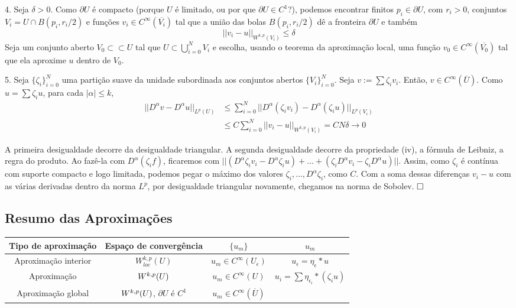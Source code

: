 \documentclass[a4paper, 11pt]{book}
\newcommand{\qed}{$\hfill\square$}
\newcommand{\pu}{\partial U}
\newcommand{\e}{\epsilon}
\begin{document}
4. Seja \( \delta >0 \). Como \( \pu \) é compacto (porque \( U \) é limitado, ou por que \( \pu \in C^1 \)?), podemos encontrar finitos \( p_i \in \pu \), com \( r_i>0 \), conjuntos \( V_i = U \cap B(p_i, r_i/2) \) e funções \( v_i \in C^\infty(\overline{V_i}) \) tal que a união das bolas \( B(p_i, r_i/2) \) dê a fronteira \( \pu \) e também \[ ||v_i - u||_{W^{k,p}(V_i)}\leq \delta \] Seja um conjunto aberto \( V_0 \subset\subset U \) tal que \( U \subset \bigcup_{i=0}^N V_i \) e escolha, usando o teorema da aproximação local, uma função \( v_0 \in C^\infty (\overline{V_0}) \) tal que ela aproxime \( u \) dentro de \( V_0 \).

5. Seja \( \{ \zeta_i \}_{i=0}^N \) uma partição suave da unidade subordinada aos conjuntos abertos \( \{V_i\}_{i=0}^N \). Seja \( v:= \sum \zeta_i v_i \). Então, \( v \in C^\infty (\overline{U}) \). Como \( u = \sum \zeta_i u \), para cada \( |\alpha|\leq k \), \begin{align*}
	||D^\alpha v - D^\alpha u||_{L^p(U)} &\leq \sum_{i=0}^{N} || D^\alpha (\zeta_i v_i) - D^\alpha (\zeta_i u)||_{L^p(V_i)}\\
	&\leq C \sum_{i=0}^N ||v_i - u||_{W^{k,p}(V_i)} = CN\delta \rightarrow 0
\end{align*}

A primeira desigualdade decorre da desigualdade triangular. A segunda desigualdade decorre da propriedade (iv), a fórmula de Leibniz, a regra do produto. Ao fazê-la com $D^\alpha(\zeta_i f)$, ficaremos com $||(D^\alpha\zeta_i v_i - D^\alpha\zeta_i u) + \ldots + (\zeta_i D^\alpha v_i - \zeta_i D^\alpha u) ||$. Assim, como $\zeta_i$ é contínua com suporte compacto e logo limitada, podemos pegar o máximo dos valores $\zeta_i, \ldots, D^\alpha\zeta_i$, como $C$. Com a soma dessas diferenças $v_i - u$ com as várias derivadas dentro da norma $L^p$, por desigualdade triangular novamente, chegamos na norma de Sobolev. \qed

\subsection*{Resumo das Aproximações}

\begin{tabular}{cccc}
	\hline
	Tipo de aproximação & Espaço de convergência & \( \{u_m\} \)  & \( u_m \) \\
	\hline
	Aproximação interior	& \( W^{k,p}_{loc}(U) \) 	& \( u_m \in C^\infty(U_\e) \) & \( u_\e = \eta_\e * u \)\\
	
	Aproximação    			& \( W^{k,p}(U) \) 		& \( u_m \in C^\infty(U)  \) & \( u_i = \sum \eta_{\e_i} * (\zeta_i u) \) \\
	
	Aproximação global	 	& \( W^{k,p}(U)\), $ \pu $ é $ C^1 $		& \( u_m \in C^\infty(\overline{U}) \) &  \\
	\hline
\end{tabular}
\end{document}
